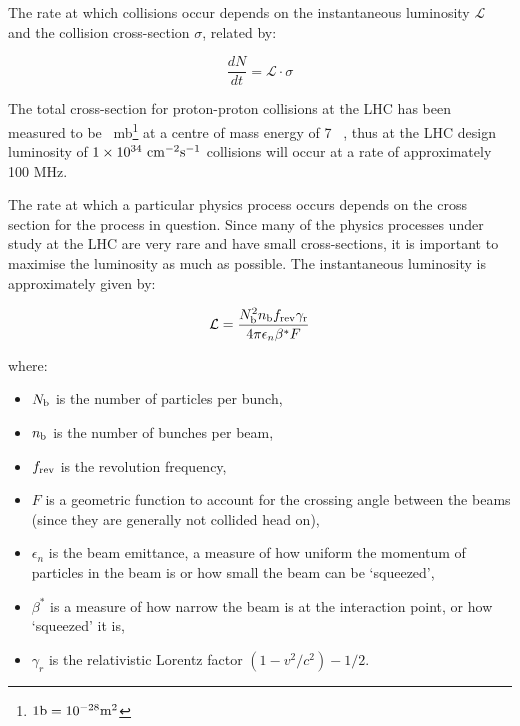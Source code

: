 The rate at which collisions occur depends on the instantaneous luminosity
$\mathcal{L}$ and the collision cross-section $\sigma$, related by:

\begin{equation}
\frac{dN}{dt} = \mathcal{L} \cdot \sigma
\end{equation}

The total cross-section for
proton-proton collisions at the LHC has been measured to be
~mb\footnote{$1 \rm{b} = 10^{-28}
m^{2}$} at a centre of mass energy of 7 \tev~\cite{0295-5075-96-2-21002}, thus
at the LHC design luminosity of $1 \times 10^{34}~\rm{cm}^{-2}\rm{s}^{-1}$
collisions will occur at a rate of approximately 100 MHz. 

The rate at which a particular
physics process occurs depends on the cross section for the process in question.
Since many of the physics processes under study at the LHC are very rare and
have small cross-sections, it is important to maximise the luminosity as much as
possible. The instantaneous luminosity is approximately given by:

\begin{equation}
\mathcal{L} = \frac{N_{\rm{b}}^{2}n_{\rm{b}}f_{\rm{rev}}\gamma_{\rm{r}}}{4\pi
\epsilon_{n}\beta^{*} F}
\end{equation}

where:

\begin{itemize}
    \item $N_{\rm{b}}$ is the number of particles per bunch,
    \item $n_{\rm{b}}$ is the number of bunches per beam, 
    \item $f_{\rm{rev}}$ is the revolution frequency, 
    \item $F$ is a geometric function to account for the crossing angle between the beams (since
they are generally not collided head on), 
    \item $\epsilon_{n}$ is the beam emittance,
a measure of how uniform the momentum of particles in the beam is or how small
the beam can be `squeezed',
    \item $\beta^{*}$ is a measure of how narrow the beam is at the interaction
    point, or how `squeezed' it is,
    \item $\gamma_{r}$ is the relativistic Lorentz factor $(1 - v^2/c^2)-{1/2}$.
\end{itemize}
    

